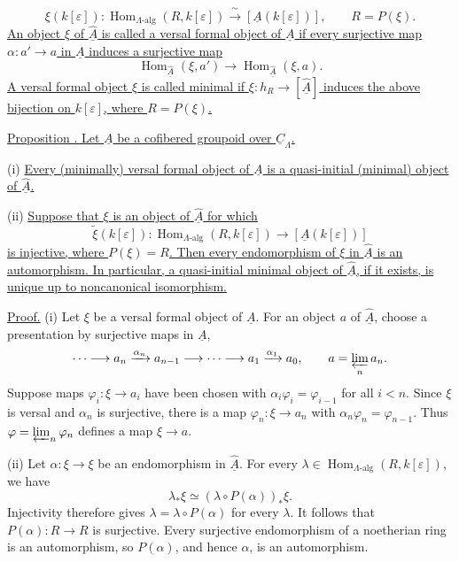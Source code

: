 \[
 \xi(k[\varepsilon]):
 \operatorname{Hom}_{\Lambda\text{-alg}}(R,k[\varepsilon])
 \xrightarrow{\ \sim\ }
 [\underline A(k[\varepsilon])],
 \qquad R=P(\xi).
\]
\underline{An object $\xi$ of $\widehat{\underline A}$ is called a
versal formal object of $\underline A$ if every surjective map
$\alpha:a'\to a$ in $\underline A$ induces a surjective map}
\[
 \operatorname{Hom}_{\widehat{\underline A}}(\xi,a')
 \longrightarrow
 \operatorname{Hom}_{\widehat{\underline A}}(\xi,a).
\]
\underline{A versal formal object $\xi$ is called minimal if
$\xi:h_R\longrightarrow[\widehat{\underline A}]$ induces the above
bijection on $k[\varepsilon]$, where $R=P(\xi)$.}

\underline{Proposition . Let $\underline A$ be a cofibered
groupoid over $\underline C_\Lambda$.}

(i) \underline{Every (minimally) versal formal object of
$\underline A$ is a quasi-initial (minimal) object of
$\widehat{\underline A}$.}

(ii) \underline{Suppose that $\xi$ is an object of
$\widehat{\underline A}$ for which}
\[
 \widetilde\xi(k[\varepsilon]):
 \operatorname{Hom}_{\Lambda\text{-alg}}(R,k[\varepsilon])
 \longrightarrow[\underline A(k[\varepsilon])]
\]
\underline{is injective, where $P(\xi)=R$. Then every endomorphism of
$\xi$ in $\widehat{\underline A}$ is an automorphism. In particular,
a quasi-initial minimal object of $\widehat{\underline A}$, if it
exists, is unique up to noncanonical isomorphism.}

\underline{Proof.} (i) Let $\xi$ be a versal formal object of
$\underline A$. For an object $a$ of $\widehat{\underline A}$, choose
a presentation by surjective maps in $\underline A$,
\[
 \cdots\longrightarrow a_n\xrightarrow{\alpha_n}a_{n-1}
 \longrightarrow\cdots\longrightarrow
 a_1\xrightarrow{\alpha_1}a_0,
 \qquad a=\varprojlim_n a_n.
\]
Suppose maps $\varphi_i:\xi\longrightarrow a_i$ have been chosen with
$\alpha_i\varphi_i=\varphi_{i-1}$ for all $i<n$. Since $\xi$ is
versal and $\alpha_n$ is surjective, there is a map
$\varphi_n:\xi\longrightarrow a_n$ with
$\alpha_n\varphi_n=\varphi_{n-1}$. Thus
$\varphi=\varprojlim_n\varphi_n$ defines a map $\xi\longrightarrow a$.

(ii) Let $\alpha:\xi\longrightarrow\xi$ be an endomorphism in
$\widehat{\underline A}$. For every
$\lambda\in\operatorname{Hom}_{\Lambda\text{-alg}}
(R,k[\varepsilon])$, we have
\[
 \lambda_*\xi\simeq
 (\lambda\circ P(\alpha))_*\xi.
\]
Injectivity therefore gives
$\lambda=\lambda\circ P(\alpha)$ for every $\lambda$. It follows that
$P(\alpha):R\longrightarrow R$ is surjective. Every surjective
endomorphism of a noetherian ring is an automorphism, so $P(\alpha)$,
and hence $\alpha$, is an automorphism.

